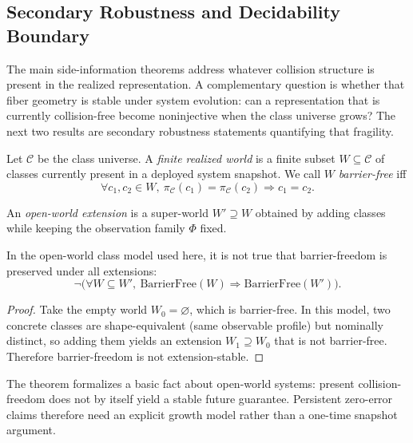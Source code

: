 \subsection{Secondary Robustness and Decidability Boundary}

The main side-information theorems address whatever collision structure is present in the realized representation. A complementary question is whether that fiber geometry is stable under system evolution: can a representation that is currently collision-free become noninjective when the class universe grows? The next two results are secondary robustness statements quantifying that fragility.

\begin{definition}
Let $\mathcal{C}$ be the class universe. A \emph{finite realized world} is a finite subset $W \subseteq \mathcal{C}$ of classes currently present in a deployed system snapshot. We call $W$ \emph{barrier-free} iff
\[
\forall c_1,c_2 \in W,\ \pi_{\mathcal C}(c_1)=\pi_{\mathcal C}(c_2) \Rightarrow c_1=c_2.
\]
\end{definition}

\begin{definition}
An \emph{open-world extension} is a super-world $W' \supseteq W$ obtained by adding classes while keeping the observation family $\Phi$ fixed.
\end{definition}

\begin{theorem}\label{thm:open-world-extension-instability}
In the open-world class model used here, it is not true that barrier-freedom is preserved under all extensions:
\[
\neg\Big(\forall W \subseteq W',\ \mathrm{BarrierFree}(W)\Rightarrow \mathrm{BarrierFree}(W')\Big).
\]
\end{theorem}

\begin{proof}
Take the empty world $W_0=\varnothing$, which is barrier-free. In this model, two concrete classes are shape-equivalent (same observable profile) but nominally distinct, so adding them yields an extension $W_1\supseteq W_0$ that is not barrier-free. Therefore barrier-freedom is not extension-stable.
\end{proof}

\begin{remark}
The theorem formalizes a basic fact about open-world systems: present collision-freedom does not by itself yield a stable future guarantee. Persistent zero-error claims therefore need an explicit growth model rather than a one-time snapshot argument.
\end{remark}

